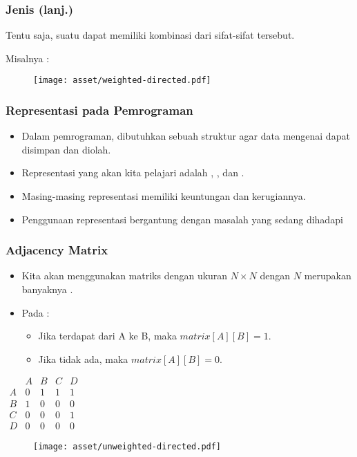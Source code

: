 \begin{frame}
\frametitle{Jenis \fGraph (lanj.)}
Tentu saja, suatu \fgraph dapat memiliki kombinasi dari sifat-sifat tersebut.

Misalnya :
\newline
\begin{figure}
  \centering
  \texttt{[image: asset/weighted-directed.pdf]}
\end{figure}
\end{frame}

\begin{frame}
\frametitle{Representasi \fGraph pada Pemrograman}

\begin{itemize}
  \item Dalam pemrograman, dibutuhkan sebuah struktur agar data mengenai \fgraph dapat disimpan dan diolah.
  \item Representasi yang akan kita pelajari adalah \fadjacencymatrix, \fadjacencylist, dan \fedgelist.
  \item Masing-masing representasi memiliki keuntungan dan kerugiannya.
  \item Penggunaan representasi \fgraph bergantung dengan masalah yang sedang dihadapi
\end{itemize}
\end{frame}

\begin{frame}
\frametitle{Adjacency Matrix}
\begin{itemize}
  \item Kita akan menggunakan matriks dengan ukuran $N \times N$ dengan $N$ merupakan banyaknya \fnode.
  \item Pada  \fgraph:
  \begin{itemize}
    \item Jika terdapat \fedge dari A ke B, maka $matrix[A][B] = 1$. 
    \item Jika tidak ada, maka $matrix[A][B] = 0$.
  \end{itemize}
\end{itemize}

\begin{center}
\begin{multicols}{2}
  $\begin{array}{c|cccc}
      & A & B & C & D \\ \hline
    A & 0 & 1 & 1 & 1 \\
    B & 1 & 0 & 0 & 0 \\
    C & 0 & 0 & 0 & 1 \\
    D & 0 & 0 & 0 & 0
  \end{array}$
  \break
  \begin{figure}
    \texttt{[image: asset/unweighted-directed.pdf]}
  \end{figure}
\end{multicols} 
\end{center}
\end{frame}

